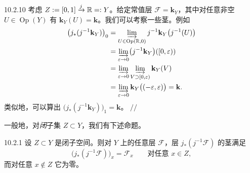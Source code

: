 \begin{wexam}{10.2.10}
  考虑 $Z:=[0,1]\xrightarrow{j}\mathbb{R}=:Y$。给定常值层
  $\mathcal{F}=\mathbf{k}_Y$，其中对任意非空 $U\in\operatorname{Op}(Y)$ 有
  $\mathbf{k}_Y(U)=\mathbf{k}$。我们可以考察一些茎。例如
  \begin{align*}
    \bigl(j_\ast(j^{-1}\mathbf{k}_Y)\bigr)_0
    &=\varinjlim_{U\in\operatorname{Op}(\mathbb{R},0)}j^{-1}\mathbf{k}_Y\bigl(j^{-1}(U)\bigr)\\
    &=\varinjlim_{\varepsilon\to0}\bigl(j^{-1}\mathbf{k}_Y\bigr)([0,\varepsilon))\\
    &=\varinjlim_{\varepsilon\to0}
    \varinjlim_{V\supset[0,\varepsilon)}\mathbf{k}_Y(V)\\
    &=\varinjlim_{\varepsilon\to0}\mathbf{k}_Y\bigl((-\varepsilon,\varepsilon)\bigr)
    =\mathbf{k}.
  \end{align*}
  类似地，可以算出 $\bigl(j_\ast(j^{-1}\mathbf{k}_Y)\bigr)_1=\mathbf{k}$。
  \hfill$//$
\end{wexam}

一般地，对\emph{闭}子集 $Z\subset Y$，我们有下述命题。

\begin{wprop}{10.2.1}
  设 $Z\subset Y$ 是闭子空间。则对 $Y$ 上的任意层 $\mathcal{F}$，层
  $j_\ast(j^{-1}\mathcal{F})$ 的茎满足
  \[
    \bigl(j_\ast(j^{-1}\mathcal{F})\bigr)_x=\mathcal{F}_x
    \qquad\text{对任意 } x\in Z,
  \]
  而对任意 $x\notin Z$ 它为零。
\end{wprop}

